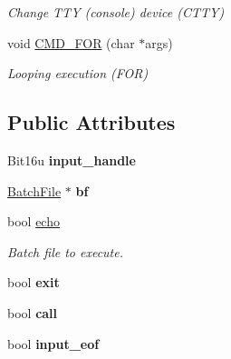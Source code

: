 \begin{DoxyCompactItemize}
\begin{DoxyCompactList}\small\item\em Change T\-T\-Y (console) device (C\-T\-T\-Y) \end{DoxyCompactList}\item 
\hypertarget{classDOS__Shell_a0d8acfd37eae2734a4a2cf623eafa536}{void \hyperlink{classDOS__Shell_a0d8acfd37eae2734a4a2cf623eafa536}{C\-M\-D\-\_\-\-F\-O\-R} (char $\ast$args)}\label{classDOS__Shell_a0d8acfd37eae2734a4a2cf623eafa536}

\begin{DoxyCompactList}\small\item\em Looping execution (F\-O\-R) \end{DoxyCompactList}\end{DoxyCompactItemize}
\subsection*{Public Attributes}
\begin{DoxyCompactItemize}
\item 
\hypertarget{classDOS__Shell_ae7e99ec60f0525ac0b2824e2ae020fa2}{Bit16u {\bfseries input\-\_\-handle}}\label{classDOS__Shell_ae7e99ec60f0525ac0b2824e2ae020fa2}

\item 
\hypertarget{classDOS__Shell_a812e2fbcc49d3523e5939235c1784a8f}{\hyperlink{classBatchFile}{Batch\-File} $\ast$ {\bfseries bf}}\label{classDOS__Shell_a812e2fbcc49d3523e5939235c1784a8f}

\item 
\hypertarget{classDOS__Shell_ab4ee052352ed1dedccf0854bcacadac2}{bool \hyperlink{classDOS__Shell_ab4ee052352ed1dedccf0854bcacadac2}{echo}}\label{classDOS__Shell_ab4ee052352ed1dedccf0854bcacadac2}

\begin{DoxyCompactList}\small\item\em Batch file to execute. \end{DoxyCompactList}\item 
\hypertarget{classDOS__Shell_ad687b7ce53d445c65c56891acd4aa660}{bool {\bfseries exit}}\label{classDOS__Shell_ad687b7ce53d445c65c56891acd4aa660}

\item 
\hypertarget{classDOS__Shell_a97d3128aca26624607d9e3acd183cfae}{bool {\bfseries call}}\label{classDOS__Shell_a97d3128aca26624607d9e3acd183cfae}

\item 
\hypertarget{classDOS__Shell_afe355c7cf53320fef3c696ee73d4de47}{bool {\bfseries input\-\_\-eof}}\label{classDOS__Shell_afe355c7cf53320fef3c696ee73d4de47}

\end{DoxyCompactItemize}
